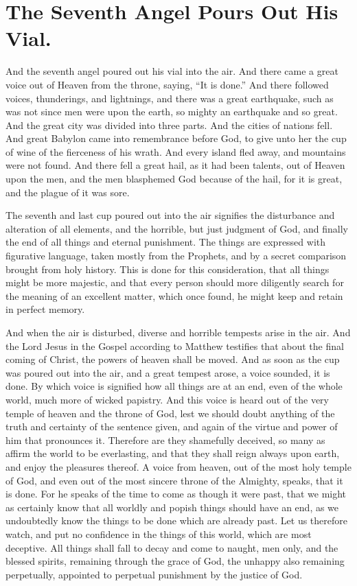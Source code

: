 \chapter[Sermon 72. The Seventh Angel Pours Out His Vial.]{The Seventh Angel Pours Out His Vial.}
\label{sermon:072}

And the seventh angel poured out his vial into the air. And there came a great voice out of Heaven from the throne, saying, “It is done.” And there followed voices, thunderings, and lightnings, and there was a great earthquake, such as was not since men were upon the earth, so mighty an earthquake and so great. And the great city was divided into three parts. And the cities of nations fell. And great Babylon came into remembrance before God, to give unto her the cup of wine of the fierceness of his wrath. And every island fled away, and mountains were not found. And there fell a great hail, as it had been talents, out of Heaven upon the men, and the men blasphemed God because of the hail, for it is great, and the plague of it was sore.

The seventh and last cup poured out into the air signifies the disturbance and alteration of all elements, and the horrible, but just judgment of God, and finally the end of all things and eternal punishment. The things are expressed with figurative language, taken mostly from the Prophets, and by a secret comparison brought from holy history. This is done for this consideration, that all things might be more majestic, and that every person should more diligently search for the meaning of an excellent matter, which once found, he might keep and retain in perfect memory.

And when the air is disturbed, diverse and horrible tempests arise in the air. And the Lord Jesus in the Gospel according to Matthew testifies that about the final coming of Christ, the powers of heaven shall be moved. And as soon as the cup was poured out into the air, and a great tempest arose, a voice sounded, it is done. By which voice is signified how all things are at an end, even of the whole world, much more of wicked papistry. And this voice is heard out of the very temple of heaven and the throne of God, lest we should doubt anything of the truth and certainty of the sentence given, and again of the virtue and power of him that pronounces it. Therefore are they shamefully deceived, so many as affirm the world to be everlasting, and that they shall reign always upon earth, and enjoy the pleasures thereof. A voice from heaven, out of the most holy temple of God, and even out of the most sincere throne of the Almighty, speaks, that it is done. For he speaks of the time to come as though it were past, that we might as certainly know that all worldly and popish things should have an end, as we undoubtedly know the things to be done which are already past. Let us therefore watch, and put no confidence in the things of this world, which are most deceptive. All things shall fall to decay and come to naught, men only, and the blessed spirits, remaining through the grace of God, the unhappy also remaining perpetually, appointed to perpetual punishment by the justice of God.

